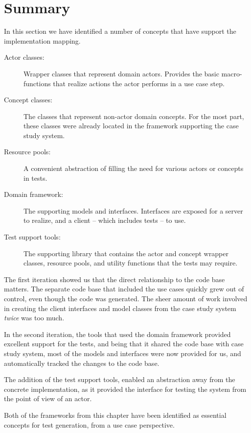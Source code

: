 \section{Summary}
In this section we have identified a number of concepts that have support the implementation mapping.
\begin{description}

  \item[Actor classes:] Wrapper classes that represent domain actors. Provides the basic macro-functions that realize actions the actor performs in a use case step.
   
  \item[Concept classes:] The classes that represent non-actor domain concepts. For the most part, these classes were already located in the framework supporting the case study system.

  \item[Resource pools:] A convenient abstraction of filling the need for various actors or concepts in tests.

  \item[Domain framework:] The supporting models and interfaces. Interfaces are exposed for a server to realize, and a client -- which includes tests -- to use.

  \item[Test support tools:] The supporting library that contains the actor and concept wrapper classes, resource pools, and utility functions that the tests may require.

\end{description}
The first iteration showed us that the direct relationship to the code base matters. The separate code base that included the use cases quickly grew out of control, even though the code was generated. The sheer amount of work involved in creating the client interfaces and model classes from the case study system \emph{twice} was too much.\medskip

\noindent In the second iteration, the tools that used the domain framework provided excellent support for the tests, and being that it shared the code base with case study system, most of the models and interfaces were now provided for us, and automatically tracked the changes to the code base.\medskip

\noindent The addition of the test support tools, enabled an abstraction away from the concrete implementation, as it provided the interface for testing the system from the point of view of an actor.\medskip

\noindent Both of the frameworks from this chapter have been identified as essential concepts for test generation, from a use case perspective.
